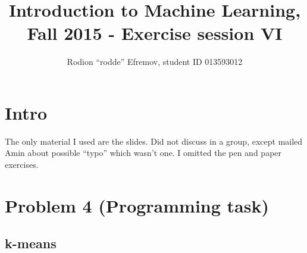 \documentclass[10pt]{article}
\title{Introduction to Machine Learning, Fall 2015 - Exercise session VI}
\author{Rodion ``rodde'' Efremov, student ID 013593012}
\begin{document}
 \maketitle

\section*{Intro}
The only material I used are the slides. Did not discuss in a group, except mailed Amin about possible ``typo'' which wasn't one. I omitted the pen and paper exercises.

\section{Problem 4 (Programming task)}
\subsection{k-means}
\end{document}
